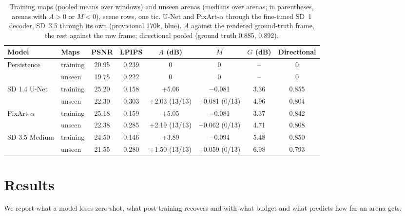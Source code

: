 \documentclass{article}
\newif\ifdraftmarks \draftmarkstrue
\newcommand{\prov}[1]{\ifdraftmarks\textcolor[rgb]{0,0.3,0.75}{#1}\else#1\fi}
\begin{document}
\begin{table}[t]
\centering\footnotesize\setlength{\tabcolsep}{3.2pt}
\caption{Training maps (pooled means over windows) and unseen arenas (medians over arenas; in parentheses, arenas with $A>0$ or $M<0$), scene rows, one tic. U-Net and PixArt-$\alpha$ through the fine-tuned SD~1 decoder, SD~3.5 through its own (provisional 170k\ifdraftmarks{}, blue\fi). $A$ against the rendered ground-truth frame, the rest against the raw frame; directional pooled (ground truth 0.885, 0.892).}
\label{tab:unseen}
\begin{tabular}{llcccccc}
\toprule
Model & Maps & PSNR & LPIPS & $A$ (dB) & $M$ & $G$ (dB) & Directional \\
\midrule
Persistence & training & 20.95 & 0.239 & 0 & 0 & -- & 0 \\
 & unseen & 19.75 & 0.222 & 0 & 0 & -- & 0 \\
SD 1.4 U-Net & training & 25.20 & 0.158 & +5.06 & $-$0.081 & 3.36 & 0.855 \\
 & unseen & 22.30 & 0.303 & +2.03 (13/13) & +0.081 (0/13) & 4.96 & 0.804 \\
PixArt-$\alpha$ & training & 25.18 & 0.159 & +5.05 & $-$0.081 & 3.37 & 0.842 \\
 & unseen & 22.38 & 0.285 & +2.19 (13/13) & +0.062 (0/13) & 4.71 & 0.808 \\
SD 3.5 Medium & training & \prov{24.50} & \prov{0.146} & \prov{+3.89} & \prov{$-$0.094} & \prov{5.48} & \prov{0.850} \\
 & unseen & \prov{21.55} & \prov{0.280} & \prov{+1.50 (13/13)} & \prov{+0.059 (0/13)} & \prov{6.98} & \prov{0.793} \\
\bottomrule
\end{tabular}
\end{table}


\section{Results}
\label{sec:results}

We report what a model loses zero-shot, what post-training recovers and with what budget and what predicts how far an arena gets.
\end{document}
